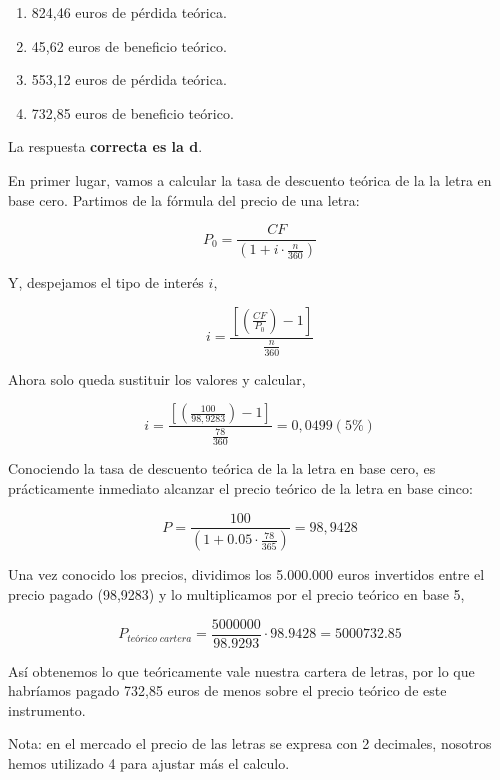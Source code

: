 \documentclass[
  letterpaper,
  DIV=11,
  numbers=noendperiod]{scrreprt}
\begin{document}
\begin{enumerate}
\def\labelenumi{\alph{enumi})}
\item
  824,46 euros de pérdida teórica.
\item
  45,62 euros de beneficio teórico.
\item
  553,12 euros de pérdida teórica.
\item
  732,85 euros de beneficio teórico.
\end{enumerate}

\begin{tcolorbox}[enhanced jigsaw, left=2mm, opacityback=0, colback=white, breakable, arc=.35mm, bottomrule=.15mm, rightrule=.15mm, toprule=.15mm, leftrule=.75mm, colframe=quarto-callout-tip-color-frame]
\begin{minipage}[t]{5.5mm}
\textcolor{quarto-callout-tip-color}{\faLightbulb}
\end{minipage}%
\begin{minipage}[t]{\textwidth - 5.5mm}

La respuesta \textbf{correcta es la d}.

En primer lugar, vamos a calcular la tasa de descuento teórica de la la
letra en base cero. Partimos de la fórmula del precio de una letra:

\[P_0=\frac{CF}{\left(1+i\cdot\frac{n}{360}\right)}\]

Y, despejamos el tipo de interés \(i\),

\[i=\frac{\left[\left(\frac{CF}{P_0}\right)-1\right]}{\frac{n}{360}}\]

Ahora solo queda sustituir los valores y calcular,

\[i=\frac{\left[\left(\frac{100}{98,9283}\right)-1\right]}{\frac{78}{360}}=0,0499(5\%)\]

Conociendo la tasa de descuento teórica de la la letra en base cero, es
prácticamente inmediato alcanzar el precio teórico de la letra en base
cinco:

\[P=\frac{100}{\left(1+0.05\cdot\frac{78}{365}\right)}= 98,9428\]

Una vez conocido los precios, dividimos los 5.000.000 euros invertidos
entre el precio pagado (98,9283) y lo multiplicamos por el precio
teórico en base 5,

\[P_{teórico\;cartera}=\frac{5000000}{98.9293}\cdot98.9428=5000732.85\]

Así obtenemos lo que teóricamente vale nuestra cartera de letras, por lo
que habríamos pagado 732,85 euros de menos sobre el precio teórico de
este instrumento.

Nota: en el mercado el precio de las letras se expresa con 2 decimales,
nosotros hemos utilizado 4 para ajustar más el calculo.

\end{minipage}%
\end{tcolorbox}
\end{document}
